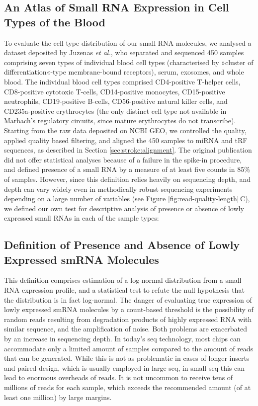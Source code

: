 \begin{method}
\subsection{An Atlas of Small RNA Expression in Cell Types of the Blood} \label{sec:stroke:juzenas}
To evaluate the cell type distribution of our small RNA molecules, we analysed a dataset deposited by Juzenas \emph{et al.},\cite{Juzenas2017} who separated and sequenced 450 samples comprising seven types of individual blood cell types (characterised by »cluster of differentiation«-type membrane-bound receptors), serum, exosomes, and whole blood. The individual blood cell types comprised CD4-positive T-helper cells, CD8-positive cytotoxic T-cells, CD14-positive monocytes, CD15-positive neutrophils, CD19-positive B-cells, CD56-positive natural killer cells, and CD235a-positive erythrocytes (the only distinct cell type not available in Marbach's regulatory circuits, since mature erythrocytes do not transcribe). Starting from the raw data deposited on NCBI GEO, we controlled the quality, applied quality based filtering, and aligned the 450 samples to miRNA and tRF sequences, as described in Section \ref{sec:stroke:alignment}. The original publication did not offer statistical analyses because of a failure in the spike-in procedure, and defined presence of a small RNA by a measure of at least five counts in 85\% of samples. However, since this definition relies heavily on sequencing depth, and depth can vary widely even in methodically robust sequencing experiments depending on a large number of variables (see Figure \ref{fig:read-quality-length}\,C), we defined our own test for descriptive analysis of presence or absence of lowly expressed small RNAs in each of the sample types:

\subsection[Definition of Presence and Absence of Lowly Expressed\texorpdfstring{\\}{} smRNA Molecules]{Definition of Presence and Absence of Lowly Expressed smRNA Molecules}
This definition comprises estimation of a log-normal distribution from a small RNA expression profile, and a statistical test to refute the null hypothesis that the distribution is in fact log-normal. The danger of evaluating true expression of lowly expressed smRNA molecules by a count-based threshold is the possibility of random reads resulting from degradation products of highly expressed RNA with similar sequence, and the amplification of noise. Both problems are exacerbated by an increase in sequencing depth. In today's \ac{seq} technology, most chips can accommodate only a limited amount of samples compared to the amount of reads that can be generated. While this is not as problematic in cases of longer inserts and paired design, which is usually employed in large \ac{seq}, in small \ac{seq} this can lead to enormous overheads of reads. It is not uncommon to receive tens of millions of reads for each sample, which exceeds the recommended amount (of at least one million) by large margins.


\end{method}
